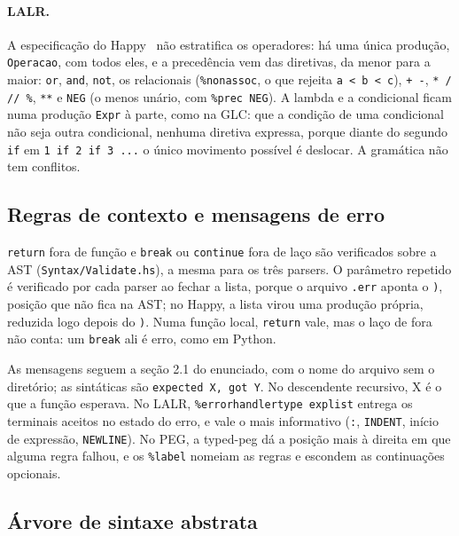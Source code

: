 \documentclass[12pt,a4paper]{article}
\begin{document}
\paragraph{LALR.} A especificação do Happy~\cite{happy} não estratifica
os operadores: há uma única produção, \texttt{Operacao}, com todos
eles, e a precedência vem das diretivas, da menor para a maior:
\texttt{or}, \texttt{and}, \texttt{not}, os relacionais
(\texttt{\%nonassoc}, o que rejeita \texttt{a < b < c}), \texttt{+ -},
\texttt{* / // \%}, \texttt{**} e \texttt{NEG} (o menos unário, com
\texttt{\%prec NEG}). A lambda e a condicional ficam numa produção
\texttt{Expr} à parte, como na GLC: que a condição de uma condicional
não seja outra condicional, nenhuma diretiva expressa, porque diante do
segundo \texttt{if} em \texttt{1 if 2 if 3 ...} o único movimento
possível é deslocar. A gramática não tem conflitos.

\subsection{Regras de contexto e mensagens de erro}
\label{sec:ctx}

\texttt{return} fora de função e \texttt{break} ou \texttt{continue} fora
de laço são verificados sobre a AST (\texttt{Syntax/Validate.hs}), a
mesma para os três parsers. O parâmetro repetido é verificado por cada
parser ao fechar a lista, porque o arquivo \texttt{.err} aponta o
\texttt{)}, posição que não fica na AST; no Happy, a lista virou uma
produção própria, reduzida logo depois do \texttt{)}. Numa função
local, \texttt{return} vale, mas o laço de fora não conta: um
\texttt{break} ali é erro, como em Python.

As mensagens seguem a seção 2.1 do enunciado, com o nome do arquivo
sem o diretório; as sintáticas são \texttt{expected X, got Y}. No
descendente recursivo, X é o que a função esperava. No LALR,
\texttt{\%errorhandlertype explist} entrega os terminais aceitos no
estado do erro, e vale o mais informativo (\texttt{:}, \texttt{INDENT},
início de expressão, \texttt{NEWLINE}). No PEG, a typed-peg dá a
posição mais à direita em que alguma regra falhou, e os \texttt{\%label}
nomeiam as regras e escondem as continuações opcionais.

\subsection{Árvore de sintaxe abstrata}
\end{document}
